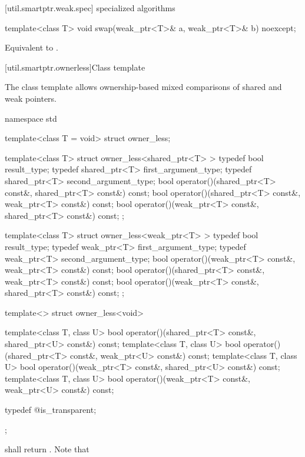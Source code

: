 [util.smartptr.weak.spec]{ specialized algorithms}

%
%
\begin{itemdecl}
template<class T> void swap(weak_ptr<T>& a, weak_ptr<T>& b) noexcept;
\end{itemdecl}

\begin{itemdescr}
\pnum\effects  Equivalent to .
\end{itemdescr}

[util.smartptr.ownerless]{Class template }

\pnum
The class template  allows ownership-based mixed comparisons of shared
and weak pointers.

\begin{codeblock}
namespace std {
  template<class T = void> struct owner_less;

  template<class T> struct owner_less<shared_ptr<T> > {
    typedef bool result_type;
    typedef shared_ptr<T> first_argument_type;
    typedef shared_ptr<T> second_argument_type;
    bool operator()(shared_ptr<T> const&, shared_ptr<T> const&) const;
    bool operator()(shared_ptr<T> const&, weak_ptr<T> const&) const;
    bool operator()(weak_ptr<T> const&, shared_ptr<T> const&) const;
  };

  template<class T> struct owner_less<weak_ptr<T> > {
    typedef bool result_type;
    typedef weak_ptr<T> first_argument_type;
    typedef weak_ptr<T> second_argument_type;
    bool operator()(weak_ptr<T> const&, weak_ptr<T> const&) const;
    bool operator()(shared_ptr<T> const&, weak_ptr<T> const&) const;
    bool operator()(weak_ptr<T> const&, shared_ptr<T> const&) const;
  };

  template<> struct owner_less<void> {
    template<class T, class U>
      bool operator()(shared_ptr<T> const&, shared_ptr<U> const&) const;
    template<class T, class U>
      bool operator()(shared_ptr<T> const&, weak_ptr<U> const&) const;
    template<class T, class U>
      bool operator()(weak_ptr<T> const&, shared_ptr<U> const&) const;
    template<class T, class U>
      bool operator()(weak_ptr<T> const&, weak_ptr<U> const&) const;

    typedef @\unspec@ is_transparent;
  };
}
\end{codeblock}

\pnum {} shall return . \enternote
Note that

